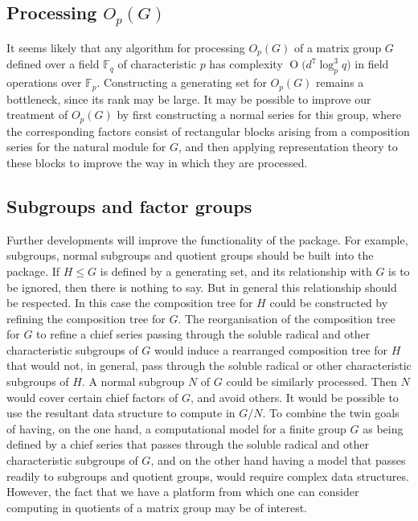 \documentclass[12pt,twoside,reqno,psamsfonts]{amsproc}
\numberwithin{equation}{section}
\numberwithin{figure}{section}
\newcounter{algorithm}
\theoremstyle{plain}
\theoremstyle{definition}
\theoremstyle{remark}
\newcommand{\field}[1]{\mathbb{#1}}
\newcommand{\F}{\field{F}}
\newcommand{\OR}[1]{\operatorname{O} \bigl( #1 \bigr)}
\begin{document}
\subsection{Processing ${O}_p(G)$}
It seems likely that any
algorithm for processing ${O}_p(G)$ 
of a matrix group $G$ 
defined over a field $\F_q$ of characteristic $p$
has complexity 
$\OR{d^7\log_p^3 q}$ in field operations over $\F_p$.  
Constructing a generating set for ${O}_p(G)$ 
remains a bottleneck,  since its rank may be large.
It may be possible to improve our treatment 
of ${O}_p(G)$ by first constructing a
normal series for this group, where the corresponding factors consist of
rectangular blocks arising from a composition series for the natural module 
for $G$, and then applying representation theory to these
blocks to improve the way in which they are processed.

\subsection{Subgroups and factor groups}
Further developments will improve the functionality of the package.  For
example, subgroups, normal subgroups and quotient groups should be built into
the package.  If $H \leqslant G$ is defined by a generating set, and its
relationship with $G$ is to be ignored, then there is nothing to say.  But in
general this relationship should be respected.  In this case the
composition tree for $H$ could be constructed by refining the composition tree
for $G$.  The reorganisation of the composition tree for $G$ to refine a chief
series passing through the soluble radical and other characteristic subgroups
of $G$ would induce a rearranged composition tree for $H$ that would not, in
general, pass through the soluble radical or other characteristic subgroups of
$H$.  A normal subgroup $N$ of $G$ could be similarly processed.  Then $N$
would cover certain chief factors of $G$, and avoid others.  It would be
possible to use the resultant data structure to compute in $G/N$.  To combine
the twin goals of having, on the one hand, a computational model for a finite
group $G$ as being defined by a chief series that passes through the soluble
radical and other characteristic subgroups of $G$, and on the other hand
having a model that passes readily to subgroups and quotient groups, would
require complex data structures.  However, the fact that we have a platform
from which one can consider computing in quotients
of a matrix group may be of interest.

%


\end{document}
